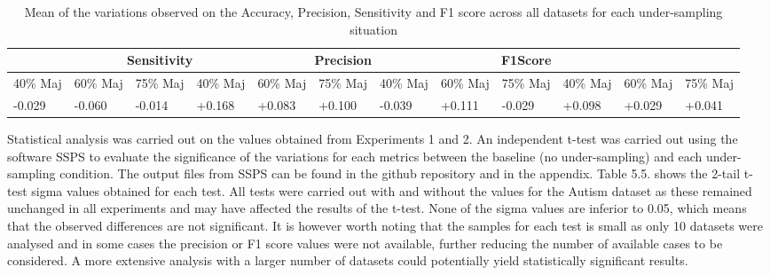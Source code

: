 \begin{table}[!htbp]
    \centering
    \begin{tabular}{p{0.8cm}p{0.8cm}p{0.8cm}p{0.8cm}p{0.8cm}p{0.8cm}p{0.8cm}p{0.8cm}p{0.8cm}p{0.8cm}p{0.8cm}p{0.8cm}}
        \hline
        \rowcolor{LightCyan}
          \multicolumn{3}{c}{Accuracy}& \multicolumn{3}{c}{Sensitivity} & \multicolumn{3}{c}{Precision} & \multicolumn{3}{c}{F1Score}  \\
          \hline
         40\% Maj & 60\% Maj & 75\% Maj & 40\% Maj & 60\% Maj & 75\% Maj & 40\% Maj & 60\% Maj & 75\% Maj & 40\% Maj & 60\% Maj & 75\% Maj \\
         -0.029&-0.060&-0.014&+0.168&+0.083&+0.100& -0.039&+0.111& -0.029&+0.098&+0.029&+0.041
    \end{tabular}
    \caption{Mean of the variations observed on the Accuracy, Precision, Sensitivity and F1 score across all datasets for each under-sampling situation}
    \label{tab:my_label}
\end{table}    	
    	
    	

Statistical analysis was carried out on the values obtained from Experiments 1 and 2. An independent t-test was carried out using the software SSPS to evaluate the significance of the variations for each metrics between the baseline (no under-sampling) and each under-sampling condition.\newline
The output files from SSPS can be found in the github repository and in the appendix. Table 5.5. shows the 2-tail t-test sigma values obtained for each test. All tests were carried out with and without the values for the Autism dataset as these remained unchanged in all experiments and may have affected the results of the t-test.\newline
None of the sigma values are inferior to 0.05, which means that the observed differences are not significant. It is however worth noting that the samples for each test is small as only 10 datasets were analysed and in some cases the precision or F1 score values were not available, further reducing the number of available cases to be considered. A more extensive analysis with a larger number of datasets could potentially yield statistically significant results.\newline

